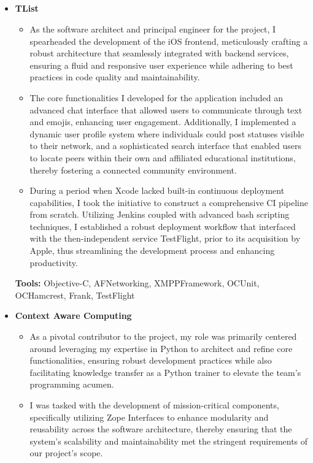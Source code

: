 \documentclass[11pt,a4paper,english]{moderncv}
\begin{document}
\subsection{}

{
\begin{itemize}
    \item \textbf{TList}
        \begin{itemize}
            \item As the software architect and principal engineer for the project, I spearheaded the development of the iOS frontend, meticulously crafting a robust architecture that seamlessly integrated with backend services, ensuring a fluid and responsive user experience while adhering to best practices in code quality and maintainability.
            \item The core functionalities I developed for the application included an advanced chat interface that allowed users to communicate through text and emojis, enhancing user engagement. Additionally, I implemented a dynamic user profile system where individuals could post statuses visible to their network, and a sophisticated search interface that enabled users to locate peers within their own and affiliated educational institutions, thereby fostering a connected community environment.
            \item During a period when Xcode lacked built-in continuous deployment capabilities, I took the initiative to construct a comprehensive CI pipeline from scratch. Utilizing Jenkins coupled with advanced bash scripting techniques, I established a robust deployment workflow that interfaced with the then-independent service TestFlight, prior to its acquisition by Apple, thus streamlining the development process and enhancing productivity.
        \end{itemize}
        \textbf{Tools:} Objective-C, AFNetworking, XMPPFramework, OCUnit, OCHamcrest, Frank, TestFlight
    \item \textbf{Context Aware Computing}
        \begin{itemize}
            \item As a pivotal contributor to the project, my role was primarily centered around leveraging my expertise in Python to architect and refine core functionalities, ensuring robust development practices while also facilitating knowledge transfer as a Python trainer to elevate the team's programming acumen.
            \item I was tasked with the development of mission-critical components, specifically utilizing Zope Interfaces to enhance modularity and reusability across the software architecture, thereby ensuring that the system's scalability and maintainability met the stringent requirements of our project's scope.

\end{itemize}
\end{itemize}}
\end{document}

